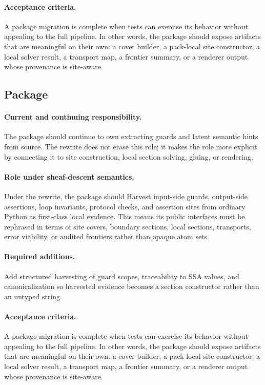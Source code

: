 \documentclass[11pt]{report}
\DeclareRobustCommand{\py}[1]{\texttt{\detokenize{#1}}}
\theoremstyle{definition}
\theoremstyle{plain}
\begin{document}
\paragraph{Acceptance criteria.}
A package migration is complete when tests can exercise its behavior without
appealing to the full pipeline. In other words, the package should expose
artifacts that are meaningful on their own: a cover builder, a pack-local
site constructor, a local solver result, a transport map, a frontier summary,
or a renderer output whose provenance is site-aware.

\subsection{Package \py{src/deppy/harvest}}

\paragraph{Current and continuing responsibility.}
The package \py{src/deppy/harvest} should continue to own extracting guards and latent semantic hints from source. The
rewrite does not erase this role; it makes the role more explicit by
connecting it to site construction, local section solving, gluing, or
rendering.

\paragraph{Role under sheaf-descent semantics.}
Under the rewrite, the package should Harvest input-side guards, output-side assertions, loop invariants, protocol checks, and assertion sites from ordinary Python as first-class local evidence. This means its public
interfaces must be rephrased in terms of site covers, boundary sections,
local sections, transports, error viability, or audited frontiers rather
than opaque atom sets.

\paragraph{Required additions.}
Add structured harvesting of guard scopes, traceability to SSA values, and canonicalization so harvested evidence becomes a section constructor rather than an untyped string.

\paragraph{Acceptance criteria.}
A package migration is complete when tests can exercise its behavior without
appealing to the full pipeline. In other words, the package should expose
artifacts that are meaningful on their own: a cover builder, a pack-local
site constructor, a local solver result, a transport map, a frontier summary,
or a renderer output whose provenance is site-aware.
\end{document}
